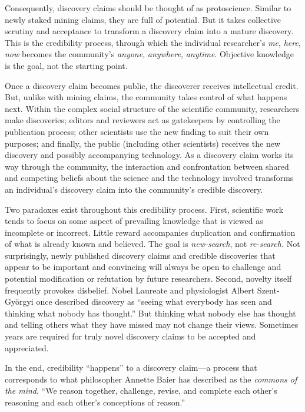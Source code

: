 Consequently, discovery claims should be thought of as protoscience.
Similar to newly staked mining claims, they are full of potential. But
it takes collective scrutiny and acceptance to transform a discovery
claim into a mature discovery. This is the credibility process, through
which the individual researcher's \emph{me}, \emph{here}, \emph{now} becomes the community's
\emph{anyone}, \emph{anywhere}, \emph{anytime}. Objective knowledge is the goal, not the
starting point.

Once a discovery claim becomes public, the discoverer receives
intellectual credit. But, unlike with mining claims, the community takes
control of what happens next. Within the complex social structure of the
scientific community, researchers make discoveries; editors and
reviewers act as gatekeepers by controlling the publication process;
other scientists use the new finding to suit their own purposes; and
finally, the public (including other scientists) receives the new
discovery and possibly accompanying technology. As a discovery claim
works its way through the community, the interaction and confrontation
between shared and competing beliefs about the science and the
technology involved transforms an individual's discovery claim into the
community's credible discovery.

Two paradoxes exist throughout this credibility process. First,
scientific work tends to focus on some aspect of prevailing knowledge
that is viewed as incomplete or incorrect. Little reward accompanies
duplication and confirmation of what is already known and believed. The
goal is \emph{new-search}, not \emph{re-search.} Not surprisingly, newly
published discovery claims and credible discoveries that appear to be
important and convincing will always be open to challenge and potential
modification or refutation by future researchers. Second, novelty itself
frequently provokes disbelief. Nobel Laureate and physiologist Albert
Szent-Györgyi once described discovery as ``seeing what everybody has
seen and thinking what nobody has thought.'' But thinking what nobody
else has thought and telling others what they have missed may not change
their views. Sometimes years are required for truly novel discovery
claims to be accepted and appreciated.

In the end, credibility ``happens'' to a discovery claim---a process
that corresponds to what philosopher Annette Baier has described as
the \emph{commons of the mind}. ``We reason together, challenge, revise, and
complete each other's reasoning and each other's conceptions of
reason.''

